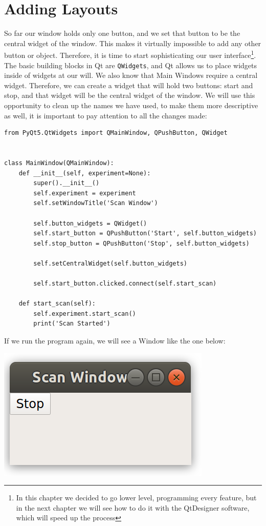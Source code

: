 \section{Adding Layouts}\label{sec:adding-layouts}
So far our window holds only one button, and we set that button to be the central widget of the window. This makes it virtually impossible to add any other button or object. Therefore, it is time to start sophisticating our user interface\footnote{In this chapter we decided to go lower level, programming every feature, but in the next chapter we will see how to do it with the QtDesigner software, which will speed up the process}. The basic building blocks in Qt are \texttt{QWidgets}, and Qt allows us to place widgets inside of widgets at our will. We also know that Main Windows require a central widget. Therefore, we can create a widget that will hold two buttons: start and stop, and that widget will be the central widget of the window. We will use this opportunity to clean up the names we have used, to make them more descriptive as well, it is important to pay attention to all the changes made:

\begin{verbatim}
from PyQt5.QtWidgets import QMainWindow, QPushButton, QWidget


class MainWindow(QMainWindow):
    def __init__(self, experiment=None):
        super().__init__()
        self.experiment = experiment
        self.setWindowTitle('Scan Window')

        self.button_widgets = QWidget()
        self.start_button = QPushButton('Start', self.button_widgets)
        self.stop_button = QPushButton('Stop', self.button_widgets)

        self.setCentralWidget(self.button_widgets)

        self.start_button.clicked.connect(self.start_scan)

    def start_scan(self):
        self.experiment.start_scan()
        print('Scan Started')
\end{verbatim}

If we run the program again, we will see a Window like the one below:

\begin{center}
    \includegraphics[width=.3\textwidth]{images/Chapter_08/05_window_without_layout.png}
\end{center}

